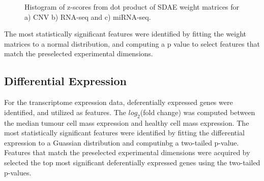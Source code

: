 \begin{figure}
\begin{subfigure}[b]{0.3\textwidth}
         \caption{}
     \end{subfigure}
        \caption{Histogram of z-scores from dot product of SDAE weight matrices for a) CNV b) RNA-seq and c) miRNA-seq.}
        \label{fig:zscoreHist}
\end{figure}

The most statistically significant features were identified by fitting the weight matrices to a normal distribution, and computing a p value to select features that match the preselected experimental dimensions.

\subsection{Differential Expression}

For the transcriptome expression data, deferentially expressed genes were identified, and utilized as features. The $log_{2}$(fold change) was computed between the median tumour cell mass expression and healthy cell mass expression. The most statistically significant features were identified by fitting the differential expression to a Guassian distribution and computinbg a two-tailed p-value. Features that match the preselected experimental dimensions were acquired by selected the top most significant deferentially expressed genes using the two-tailed p-values. 

